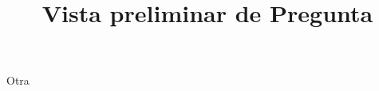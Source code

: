 \documentclass[a4paper,10pt]{article}\usepackage[utf8]{inputenc}\usepackage[spanish]{babel}\usepackage{times}
\title{Vista preliminar de Pregunta}
\begin{document}
\twocolumn 

\maketitle

Otra
\end{document}
